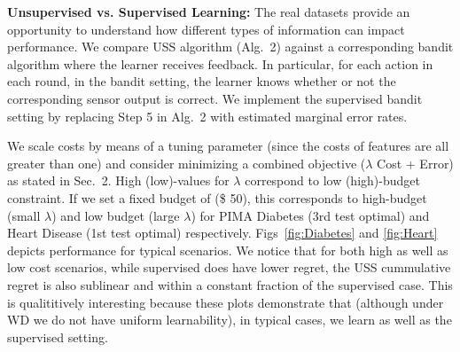 \documentclass[11pt]{article} %
\begin{document}
\noindent
{\bf Unsupervised vs. Supervised Learning:}
The real datasets provide an opportunity to understand how different types of information can impact performance. We compare USS algorithm (Alg.~2) against a corresponding bandit algorithm where the learner receives feedback. In particular, for each action in each round, in the bandit setting, the learner knows whether or not the corresponding sensor output is correct. We implement the supervised bandit setting by replacing Step 5 in Alg.~2 with estimated marginal error rates. 

We scale costs by means of a tuning parameter (since the costs of features are all greater than one) and consider minimizing a combined objective ($\lambda$ Cost + Error) as stated in Sec.~2. High (low)-values for $\lambda$ correspond to low (high)-budget constraint. If we set a fixed budget of (\$ 50), this corresponds to high-budget (small $\lambda$) and low budget (large $\lambda$) for PIMA Diabetes (3rd test optimal) and Heart Disease (1st test optimal) respectively. Figs~\ref{fig:Diabetes} and \ref{fig:Heart} depicts performance for typical scenarios. We notice that for both high as well as low cost scenarios, while supervised does have lower regret, the USS cummulative regret is also sublinear and within a constant fraction of the supervised case. This is qualititively interesting because these plots demonstrate that (although under WD we do not have uniform learnability), in typical cases, we learn as well as the supervised setting. %
\end{document}
